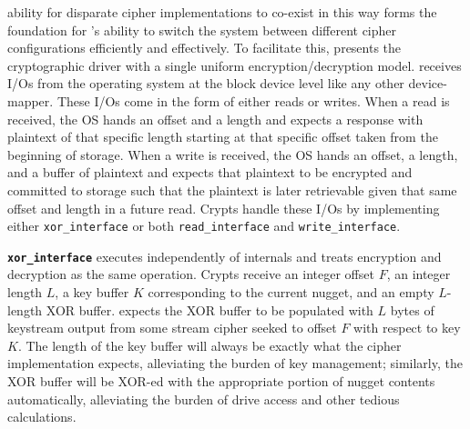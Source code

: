 ability for disparate cipher implementations to co-exist in this way
forms the foundation for \sys's ability to switch the system between
different cipher configurations efficiently and effectively. To
facilitate this, \sysB presents the cryptographic driver with a single
uniform encryption/decryption model. \sys receives I/Os from the
operating system at the block device level like any other
device-mapper. These I/Os come in the form of either reads or
writes. When a read is received, the OS hands \sys an offset and a
length and expects a response with plaintext of that specific length
starting at that specific offset taken from the beginning of
storage. When a write is received, the OS hands \sys an offset, a
length, and a buffer of plaintext and expects that plaintext to be
encrypted and committed to storage such that the plaintext is later
retrievable given that same offset and length in a future read. Crypts
handle these I/Os by implementing either \texttt{xor\_interface} or
both \texttt{read\_interface} and \texttt{write\_interface}. 


{\bf \texttt{xor\_interface}} executes independently of \sys internals and
treats encryption and decryption as the same operation. Crypts receive an
integer offset $F$, an integer length $L$, a key buffer $K$ corresponding to the
current nugget, and an empty $L$-length XOR buffer. \sys expects the XOR buffer
to be populated with $L$ bytes of keystream output from some stream cipher
seeked to offset $F$ with respect to key $K$. The length of the key buffer will
always be exactly what the cipher implementation expects, alleviating the burden
of key management; similarly, the XOR buffer will be XOR-ed with the appropriate
portion of nugget contents automatically, alleviating the burden of drive access
and other tedious calculations.

